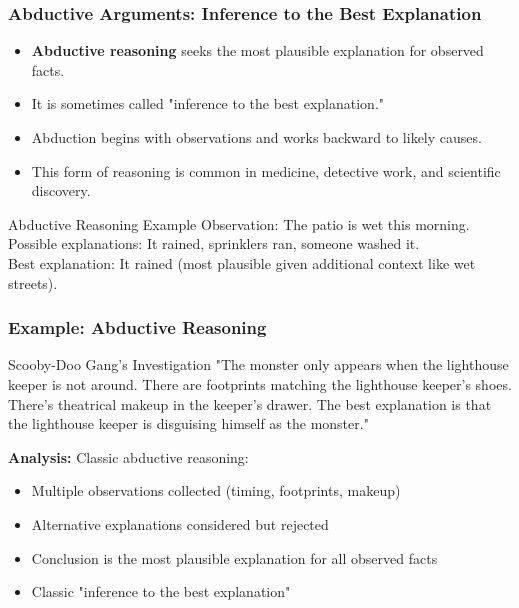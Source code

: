 \documentclass{beamer}
\begin{document}
\begin{frame}
    \frametitle{Abductive Arguments: Inference to the Best Explanation}
    \begin{itemize}
        \item \textbf{Abductive reasoning} seeks the most plausible explanation for observed facts.
        \item It is sometimes called "inference to the best explanation."
        \item Abduction begins with observations and works backward to likely causes.
        \item This form of reasoning is common in medicine, detective work, and scientific discovery.
    \end{itemize}
    
    \begin{exampleblock}{Abductive Reasoning Example}
        Observation: The patio is wet this morning.\\
        Possible explanations: It rained, sprinklers ran, someone washed it.\\
        Best explanation: It rained (most plausible given additional context like wet streets).
    \end{exampleblock}
\end{frame}

\begin{frame}
    \frametitle{Example: Abductive Reasoning}
    
    \begin{exampleblock}{Scooby-Doo Gang's Investigation}
        "The monster only appears when the lighthouse keeper is not around. There are footprints matching the lighthouse keeper's shoes. There's theatrical makeup in the keeper's drawer. The best explanation is that the lighthouse keeper is disguising himself as the monster."
        
        \textbf{Analysis:} Classic abductive reasoning:
        \begin{itemize}
            \item Multiple observations collected (timing, footprints, makeup)
            \item Alternative explanations considered but rejected
            \item Conclusion is the most plausible explanation for all observed facts
            \item Classic "inference to the best explanation"
        \end{itemize}
    \end{exampleblock}
\end{frame}
\end{document}
